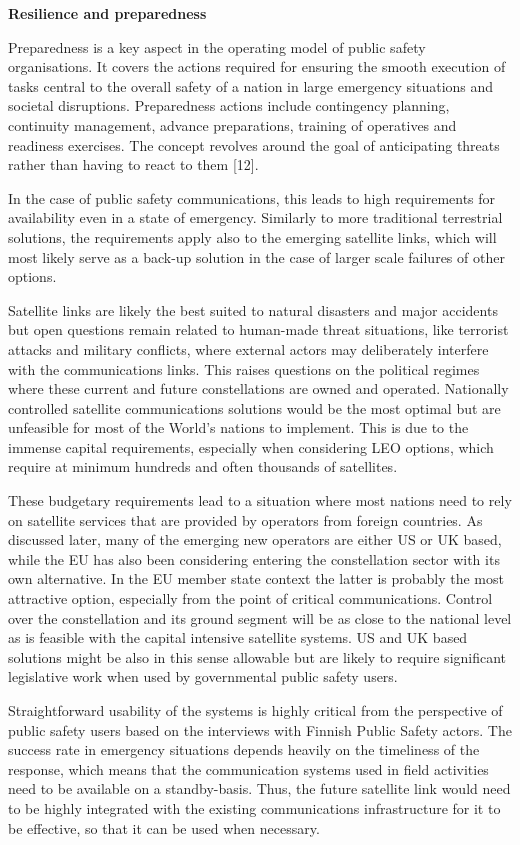 \documentclass[english, 12pt, a4paper, elec, utf8, a-1b, online]{aaltothesis}
\begin{document}
\textbf{Resilience and preparedness}

Preparedness is a key aspect in the operating model of public safety organisations. It covers the actions required for ensuring the smooth execution of tasks central to the overall safety of a nation in large emergency situations and societal disruptions. Preparedness actions include contingency planning, continuity management, advance preparations, training of operatives and readiness exercises. The concept revolves around the goal of anticipating threats rather than having to react to them [12].

In the case of public safety communications, this leads to high requirements for availability even in a state of emergency. Similarly to more traditional terrestrial solutions, the requirements apply also to the emerging satellite links, which will most likely serve as a back-up solution in the case of larger scale failures of other options.

Satellite links are likely the best suited to natural disasters and major accidents but open questions remain related to human-made threat situations, like terrorist attacks and military conflicts, where external actors may deliberately interfere with the communications links. This raises questions on the political regimes where these current and future constellations are owned and operated. Nationally controlled satellite communications solutions would be the most optimal but are unfeasible for most of the World’s nations to implement. This is due to the immense capital requirements, especially when considering LEO options, which require at minimum hundreds and often thousands of satellites.

These budgetary requirements lead to a situation where most nations need to rely on satellite services that are provided by operators from foreign countries. As discussed later, many of the emerging new operators are either US or UK based, while the EU has also been considering entering the constellation sector with its own alternative. In the EU member state context the latter is probably the most attractive option, especially from the point of critical communications. Control over the constellation and its ground segment will be as close to the national level as is feasible with the capital intensive satellite systems. US and UK based solutions might be also in this sense allowable but are likely to require significant legislative work when used by governmental public safety users.

Straightforward usability of the systems is highly critical from the perspective of public safety users based on the interviews with Finnish Public Safety actors. The success rate in emergency situations depends heavily on the timeliness of the response, which means that the communication systems used in field activities need to be available on a standby-basis. Thus, the future satellite link would need to be highly integrated with the existing communications infrastructure for it to be effective, so that it can be used when necessary.
\end{document}
